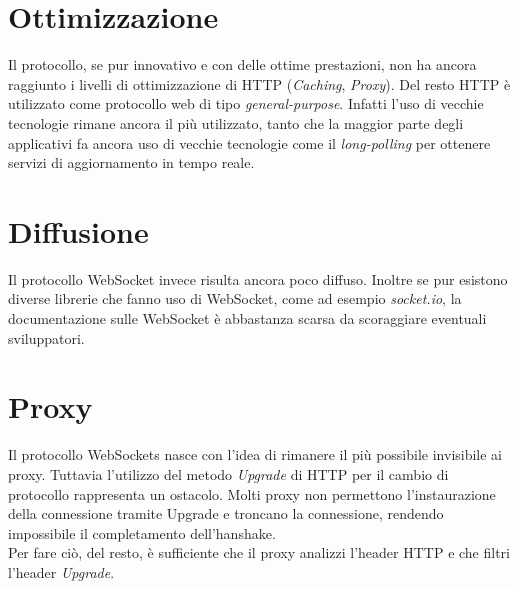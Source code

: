 \documentclass[
  oneside,
  11pt, a4paper,
  footinclude=true,
  headinclude=true,
  cleardoublepage=empty
]{scrbook}
\begin{document}
\section{Ottimizzazione}
Il protocollo, se pur innovativo e con delle ottime prestazioni, non ha ancora raggiunto i livelli di ottimizzazione di HTTP (\textit{Caching}, \textit{Proxy}).
Del resto HTTP è utilizzato come protocollo web di tipo \textit{general-purpose}.
Infatti l'uso di vecchie tecnologie rimane ancora il più utilizzato, tanto che la maggior parte degli applicativi fa ancora uso di vecchie tecnologie come il \textit{long-polling} per ottenere servizi di aggiornamento in tempo reale.\\
\section{Diffusione}
Il protocollo WebSocket invece risulta ancora poco diffuso.
Inoltre se pur esistono diverse librerie che fanno uso di WebSocket, come ad esempio \textit{socket.io}, la documentazione sulle WebSocket è abbastanza scarsa da scoraggiare eventuali sviluppatori.
\section{Proxy}
Il protocollo WebSockets nasce con l'idea di rimanere il più possibile invisibile ai proxy.
Tuttavia l'utilizzo del metodo \textit{Upgrade} di HTTP per il cambio di protocollo rappresenta un ostacolo.
Molti proxy non permettono l'instaurazione della connessione tramite Upgrade e troncano la connessione, rendendo impossibile il completamento dell'hanshake.\\
Per fare ciò, del resto, è sufficiente che il proxy analizzi l'header HTTP e che filtri l'header \textit{Upgrade}.
\end{document}
